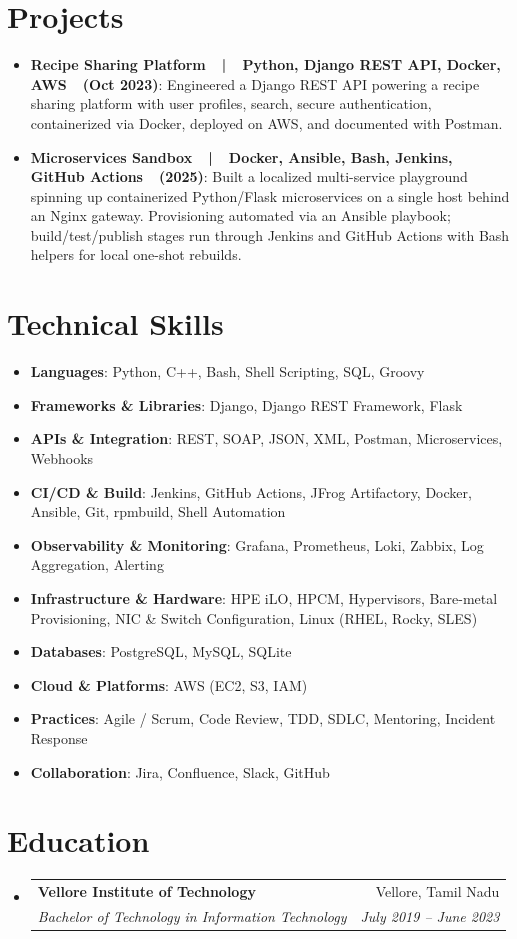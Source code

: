 \documentclass[a4paper,11pt]{article}
\makeatletter
\newcommand{\resumeItem}[2]{
  \item\small{
    \textbf{#1}{: #2 \vspace{-2pt}}
  }
}
\newcommand{\resumeSubheading}[4]{
  \vspace{-1pt}\item
    \begin{tabular*}{0.97\textwidth}{l@{\extracolsep{\fill}}r}
      \textbf{#1} & #2 \\
      \textit{#3} & \textit{#4} \\
    \end{tabular*}\vspace{-5pt}
}
\newcommand{\resumeSubItem}[2]{\resumeItem{#1}{#2}\vspace{-3pt}}
\newcommand{\resumeSubHeadingListStart}{\begin{itemize}[leftmargin=*]}
\newcommand{\resumeSubHeadingListEnd}{\end{itemize}}
\makeatother
\begin{document}
\section{Projects}
\resumeSubHeadingListStart
  \resumeSubItem{Recipe Sharing Platform~~|~~Python, Django REST API, Docker, AWS~~(Oct 2023)}
    {Engineered a Django REST API powering a recipe sharing platform with user profiles, search, secure authentication, containerized via Docker, deployed on AWS, and documented with Postman.}
  \resumeSubItem{Microservices Sandbox~~|~~Docker, Ansible, Bash, Jenkins, GitHub Actions~~(2025)}
    {Built a localized multi-service playground spinning up containerized Python/Flask microservices on a single host behind an Nginx gateway. Provisioning automated via an Ansible playbook; build/test/publish stages run through Jenkins and GitHub Actions with Bash helpers for local one-shot rebuilds.}
\resumeSubHeadingListEnd

\section{Technical Skills}
\resumeSubHeadingListStart
  \resumeSubItem{Languages}{Python, C++, Bash, Shell Scripting, SQL, Groovy}
  \resumeSubItem{Frameworks \& Libraries}{Django, Django REST Framework, Flask}
  \resumeSubItem{APIs \& Integration}{REST, SOAP, JSON, XML, Postman, Microservices, Webhooks}
  \resumeSubItem{CI/CD \& Build}{Jenkins, GitHub Actions, JFrog Artifactory, Docker, Ansible, Git, rpmbuild, Shell Automation}
  \resumeSubItem{Observability \& Monitoring}{Grafana, Prometheus, Loki, Zabbix, Log Aggregation, Alerting}
  \resumeSubItem{Infrastructure \& Hardware}{HPE iLO, HPCM, Hypervisors, Bare-metal Provisioning, NIC \& Switch Configuration, Linux (RHEL, Rocky, SLES)}
  \resumeSubItem{Databases}{PostgreSQL, MySQL, SQLite}
  \resumeSubItem{Cloud \& Platforms}{AWS (EC2, S3, IAM)}
  \resumeSubItem{Practices}{Agile / Scrum, Code Review, TDD, SDLC, Mentoring, Incident Response}
  \resumeSubItem{Collaboration}{Jira, Confluence, Slack, GitHub}
\resumeSubHeadingListEnd

\section{Education}
  \resumeSubHeadingListStart
    \resumeSubheading
      {Vellore Institute of Technology}{Vellore, Tamil Nadu}
      {Bachelor of Technology in Information Technology}{July 2019 -- June 2023}
  \resumeSubHeadingListEnd
\end{document}
